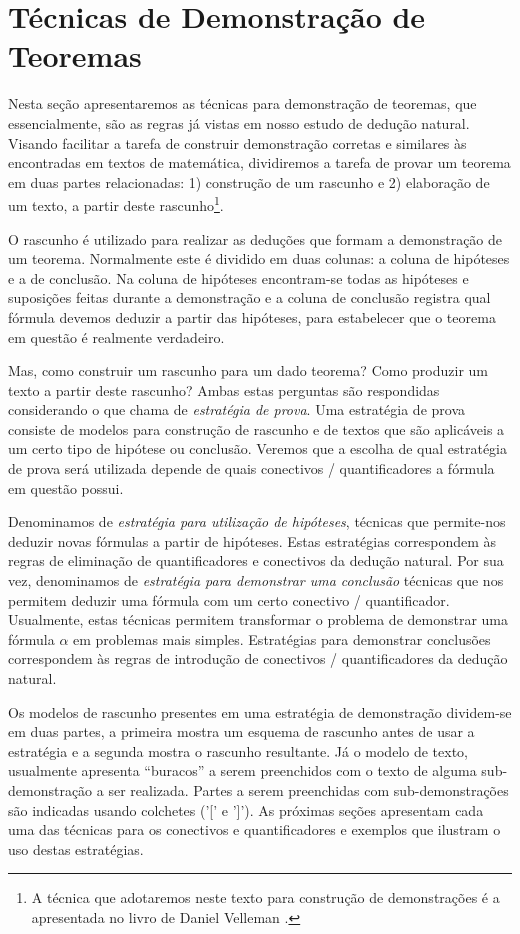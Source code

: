 \section{Técnicas de Demonstração de Teoremas}

Nesta seção apresentaremos as técnicas para demonstração de teoremas,
que essencialmente, são as regras já vistas em nosso estudo de dedução natural.
Visando facilitar a tarefa de construir demonstração corretas e similares
às encontradas em textos de matemática, dividiremos a tarefa de
provar um teorema em duas partes relacionadas: 1) construção de um
rascunho e 2) elaboração de um texto, a partir deste rascunho\footnote{A
  técnica que adotaremos neste texto para construção de demonstrações
  é a apresentada no livro de Daniel Velleman \cite{Velleman06}.}.

O rascunho é utilizado para realizar as deduções que formam a
demonstração de um teorema. Normalmente este é dividido em duas
colunas: a coluna de hipóteses e a de conclusão. Na coluna de hipóteses
encontram-se todas as hipóteses e suposições feitas durante a
demonstração e a coluna de conclusão registra qual fórmula devemos
deduzir a partir das hipóteses, para estabelecer que o teorema em
questão é realmente verdadeiro.

Mas, como construir um rascunho para um dado teorema? Como produzir um
texto a partir deste rascunho? Ambas estas perguntas são respondidas
considerando o que \cite{Velleman06} chama de \emph{estratégia de
  prova}. Uma estratégia de prova consiste de modelos para construção de
rascunho e de textos que são aplicáveis a um certo tipo de hipótese ou
conclusão. Veremos que a escolha de qual estratégia de prova será
utilizada depende de quais conectivos / quantificadores a fórmula em
questão possui.

Denominamos de \emph{estratégia para utilização de
hipóteses}, técnicas que permite-nos deduzir novas fórmulas a partir de
hipóteses. Estas estratégias correspondem às regras de eliminação de
quantificadores e conectivos da dedução natural. Por sua vez,
denominamos de \emph{estratégia para demonstrar uma conclusão}
técnicas que nos permitem deduzir uma fórmula com um certo conectivo /
quantificador. Usualmente, estas técnicas permitem transformar o
problema de demonstrar uma fórmula $\alpha$ em problemas mais
simples. Estratégias para demonstrar conclusões correspondem às regras
de introdução de conectivos / quantificadores da dedução natural.

Os modelos de rascunho presentes em uma estratégia de demonstração
dividem-se em duas partes, a primeira mostra um esquema de rascunho
antes de usar a estratégia e a segunda mostra o rascunho
resultante. Já o modelo de texto, usualmente apresenta ``buracos''  a
serem preenchidos com o texto de alguma sub-demonstração a ser
realizada. Partes a serem preenchidas com sub-demonstrações são
indicadas usando colchetes ('[' e ']'). As próximas seções apresentam
cada uma das técnicas para os conectivos e quantificadores e exemplos
que ilustram o uso destas estratégias.

